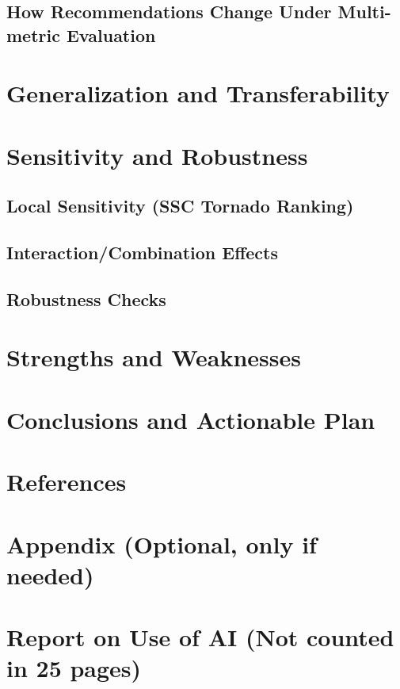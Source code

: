 \subsection{How Recommendations Change Under Multi-metric Evaluation}

\section{Generalization and Transferability}

\section{Sensitivity and Robustness}
\subsection{Local Sensitivity (SSC Tornado Ranking)}
\subsection{Interaction/Combination Effects}
\subsection{Robustness Checks}

\section{Strengths and Weaknesses}

\section{Conclusions and Actionable Plan}

\section*{References}

\appendix
\section{Appendix (Optional, only if needed)}

\newpage
\section*{Report on Use of AI (Not counted in 25 pages)}
